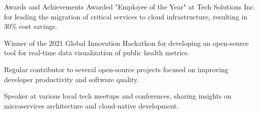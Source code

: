 \begin{rubric}{Awards and Achievements}
\entry*
Awarded "Employee of the Year" at Tech Solutions Inc. for leading the migration of critical services to cloud infrastructure, resulting in 30\% cost savings.

\entry*
Winner of the 2021 Global Innovation Hackathon for developing an open-source tool for real-time data visualization of public health metrics.

\entry*
Regular contributor to several open-source projects focused on improving developer productivity and software quality.

\entry*
Speaker at various local tech meetups and conferences, sharing insights on microservices architecture and cloud-native development.


\end{rubric}